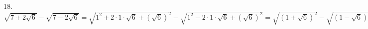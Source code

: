 18. $\sqrt{7+2\sqrt{6}}-\sqrt{7-2\sqrt{6}}=\sqrt{1^2+2\cdot1\cdot\sqrt{6}+(\sqrt{6})^2}-\sqrt{1^2-2\cdot1\cdot\sqrt{6}+(\sqrt{6})^2}=\sqrt{(1+\sqrt{6})^2}-
\sqrt{(1-\sqrt{6})^2}=|1+\sqrt{6}|-|1-\sqrt{6}|=1+\sqrt{6}-\sqrt{6}+1=2.$\\
